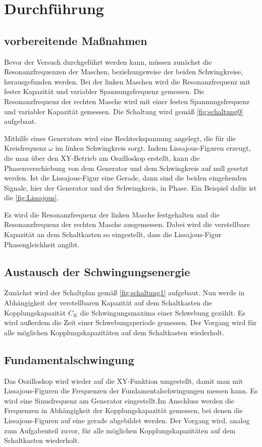 \section{Durchführung}
\label{sec:Durchführung}

\subsection{vorbereitende Maßnahmen}
Bevor der Versuch durchgeführt werden kann, müssen zunächst die Resonanzfrequenzen der Maschen, beziehungsweise der beiden Schwingkreise,
herausgefunden werden.
Bei der linken Maschen wird die Resonanzfrequenz mit fester Kapazität und variabler Spannungsfrequenz %
gemessen. Die Resonanzfrequenz der rechten Masche wird mit einer festen Spannungsfrequenz und variabler Kapazität  gemessen.
Die Schaltung wird gemäß \autoref{fig:schaltung0} aufgebaut. 

Mithilfe eines Generators wird eine Rechteckspannung angelegt, die  für die Kreisfrequenz $\omega$ im linken Schwingkreis sorgt. 
Indem Lissajous-Figuren erzeugt, die man über den XY-Betrieb am Oszilloskop erstellt, kann die Phasenverschiebung von dem Generator und 
dem Schwingkreis auf null gesetzt werden. Ist die Lissajous-Figur eine Gerade, dann sind die beiden eingehenden Signale, hier der
Generator und der Schwingkreis, in Phase. Ein Beispiel dafür ist die \autoref{fig:Lissajous}.

Es wird die Resonanzfrequenz der linken Masche festgehalten und die Resonanzfrequenz der rechten Masche ausgemessen.
Dabei wird die verstellbare Kapazität an dem Schaltkasten so eingestellt, dass die Lissajous-Figur Phasengleichheit angibt.

\subsection{Austausch der Schwingungsenergie}
Zunächst wird der Schaltplan gemäß \autoref{fig:schaltung1} aufgebaut. Nun werde in Abhängigkeit der verstellbaren Kapazität auf dem Schaltkasten
die Kopplungskapazität $C_K$ die Schwingungsmaxima einer Schwebung gezählt. Es wird außerdem die Zeit einer Schwebungsperiode gemessen.
Der Vorgang wird für alle möglichen Kopplungskapazitäten auf dem Schaltkasten wiederholt.

\subsection{Fundamentalschwingung}
Das Oszilloskop wird wieder auf die XY-Funktion umgestellt, damit man mit Lissajous-Figuren die Frequenzen der Fundamentalschwingungen messen kann. 
Es wird eine Sinusfrequenz am Generator eingestellt.Im Anschluss werden die Frequenzen in Abhängigkeit der Kopplungskapazität gemessen, bei denen 
die Lissajous-Figuren auf eine gerade abgebildet werden. Der Vorgang wird, analog zum Aufgabenteil zuvor, für alle möglichen Kopplungskapazitäten 
auf dem Schaltkasten wiederholt.

